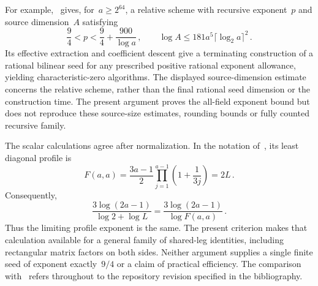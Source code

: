 \documentclass[11pt,letterpaper]{article}
\theoremstyle{definition}
\numberwithin{equation}{section}
\begin{document}
For example,~\cite[Theorems 1.1--1.2]{Extraction} gives, for~$a\geq2^{64}$, a relative scheme with recursive exponent~$p$ and source dimension~$A$ satisfying
\begin{equation*}
 \frac94<p<\frac94+\frac{900}{\log a}\,,\qquad
 \log A\leq181a^5\lceil\log_2a\rceil^2\,.
\end{equation*}
Its effective extraction and coefficient descent give a terminating construction of a rational bilinear seed for any prescribed positive rational exponent allowance, yielding characteristic-zero algorithms. The displayed source-dimension estimate concerns the relative scheme, rather than the final rational seed dimension or the construction time. The present argument proves the all-field exponent bound but does not reproduce these source-size estimates, rounding bounds or fully counted recursive family.

The scalar calculations agree after normalization. In the notation of~\cite[Theorem 3.2]{Extraction}, its least diagonal profile is
\begin{equation*}
 F(a,a)=\frac{3a-1}{2}\prod_{j=1}^{a-1}\left(1+\frac1{3j}\right)=2L\,.
\end{equation*}
Consequently,
\begin{equation*}
 \frac{3\log(2a-1)}{\log2+\log L}
 =\frac{3\log(2a-1)}{\log F(a,a)}\,.
\end{equation*}
Thus the limiting profile exponent is the same. The present criterion makes that calculation available for a general family of shared-leg identities, including rectangular matrix factors on both sides. Neither argument supplies a single finite seed of exponent exactly~$9/4$ or a claim of practical efficiency. The comparison with~\cite{Extraction} refers throughout to the repository revision specified in the bibliography.



\end{document}
